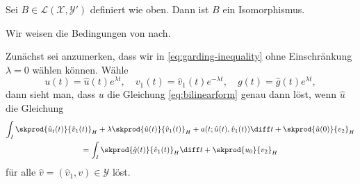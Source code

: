 \begin{Satz}
    Sei $B \in \mathcal L(\mathcal X, \mathcal Y')$ definiert wie oben.
    Dann ist $B$ ein Isomorphismus.

    \begin{Beweis}
        Wir weisen die Bedingungen von  nach.

        Zunächst sei anzumerken, dass wir in \eqref{eq:garding-inequality} ohne Einschränkung $\lambda = 0$ wählen können.
        Wähle 
        \begin{equation}
            u(t) = \hat u(t) e^{\lambda t}, \quad v_{1}(t) = \hat v_{1}(t) e^{- \lambda t}, \quad g(t) = \hat g(t) e^{\lambda t},
        \end{equation}
        dann sieht man, dass $u$ die Gleichung \eqref{eq:bilinearform} genau dann löst, wenn $\hat u$ die Gleichung
        \begin{equation}
            \label{eq:bilinearform_tmp}
            \begin{gathered}
                \int_{I} \skprod{\hat{u}_{t}(t)}{\hat{v}_{1}(t)}_{H} + \lambda \skprod{\hat{u}(t)}{\hat{v}_{1}(t)}_{H} + a(t; \hat{u}(t), \hat{v}_{1}(t)) \diff t + \skprod{\hat{u}(0)}{v_{2}}_{H}
                    \\= \int_{I} \skprod{\hat{g}(t)}{\hat{v}_{1}(t)}_{H} \diff t + \skprod{u_{0}}{v_{2}}_{H}
            \end{gathered}
        \end{equation}
        für alle $\hat{v} = (\hat{v}_{1}, v) \in \mathcal Y$ löst.


\end{Beweis}
\end{Satz}

